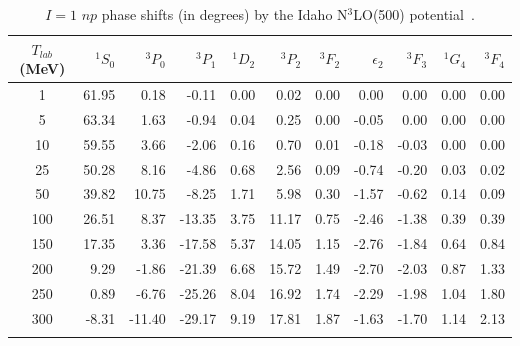 \documentclass[sort&compress,preprint,3p]{elsarticle}
\begin{document}
\begin{table}
\caption{$I=1$ $np$ phase shifts (in degrees) by the Idaho N$^3$LO(500) potential~\cite{EM03}.
\label{tab_np1}}
\smallskip
\begin{tabular*}{\textwidth}{@{\extracolsep{\fill}}crrrrrrrrrr}
\hline 
\hline 
\noalign{\smallskip}
 $T_{lab}$ (MeV)
 & $^1S_0$
 & $^3P_0$
 & $^3P_1$
 & $^1D_2$
 & $^3P_2$
 & $^3F_2$
 & $\epsilon_2$
 & $^3F_3$
 & $^1G_4$
 & $^3F_4$
\\
 \hline 
    1 &  61.95 &   0.18 &  -0.11 &   0.00 &   0.02 &   0.00 &   0.00 &   0.00 &   0.00 &   0.00 \\
    5 &  63.34 &   1.63 &  -0.94 &   0.04 &   0.25 &   0.00 &  -0.05 &   0.00 &   0.00 &   0.00 \\
   10 &  59.55 &   3.66 &  -2.06 &   0.16 &   0.70 &   0.01 &  -0.18 &  -0.03 &   0.00 &   0.00 \\
   25 &  50.28 &   8.16 &  -4.86 &   0.68 &   2.56 &   0.09 &  -0.74 &  -0.20 &   0.03 &   0.02 \\
   50 &  39.82 &  10.75 &  -8.25 &   1.71 &   5.98 &   0.30 &  -1.57 &  -0.62 &   0.14 &   0.09 \\
  100 &  26.51 &   8.37 & -13.35 &   3.75 &  11.17 &   0.75 &  -2.46 &  -1.38 &   0.39 &   0.39 \\
  150 &  17.35 &   3.36 & -17.58 &   5.37 &  14.05 &   1.15 &  -2.76 &  -1.84 &   0.64 &   0.84 \\
  200 &   9.29 &  -1.86 & -21.39 &   6.68 &  15.72 &   1.49 &  -2.70 &  -2.03 &   0.87 &   1.33 \\
  250 &   0.89 &  -6.76 & -25.26 &   8.04 &  16.92 &   1.74 &  -2.29 &  -1.98 &   1.04 &   1.80 \\
  300 &  -8.31 & -11.40 & -29.17 &   9.19 &  17.81 &   1.87 &  -1.63 &  -1.70 &   1.14 &   2.13 \\
\hline
\hline
\noalign{\smallskip}
\end{tabular*}
\end{table}
\end{document}
